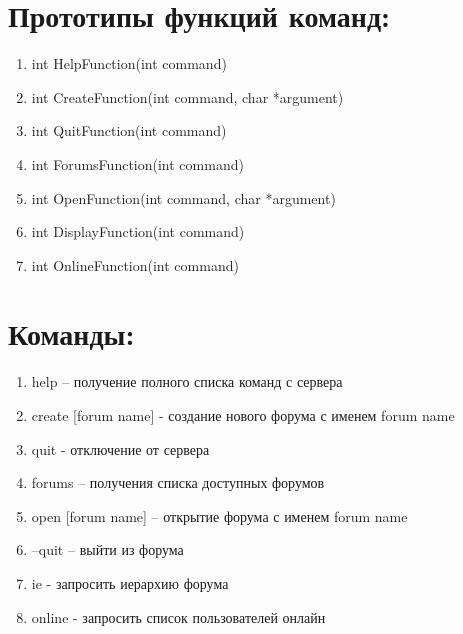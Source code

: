 \documentclass[a4paper,12pt]{extarticle}
\begin{document}
\section{Прототипы функций команд:}
\begin{enumerate}
\item int HelpFunction(int command)
\item int CreateFunction(int command, char *argument)
\item int QuitFunction(int command)
\item int ForumsFunction(int command)
\item int OpenFunction(int command, char *argument)
\item int DisplayFunction(int command)
\item int OnlineFunction(int command)
\end{enumerate}

\section{Команды:}
\begin{enumerate}
\item help – получение полного списка команд с сервера
\item create [forum name] - создание нового форума с именем forum name
\item quit -  отключение от сервера
\item forums – получения списка доступных форумов
\item open [forum name] – открытие форума с именем forum name
\item --quit – выйти из форума
\item ie - запросить иерархию форума
\item online - запросить список пользователей онлайн
\end{enumerate}
\end{document}
